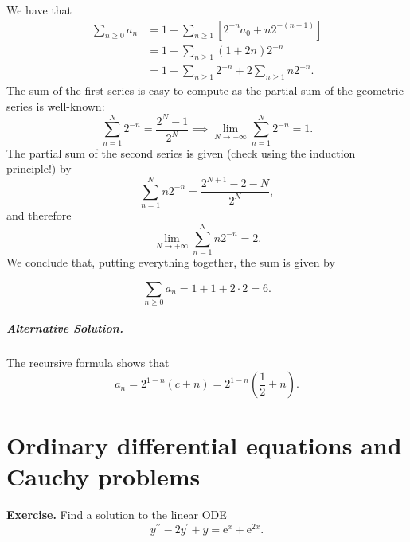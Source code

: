 \documentclass[a4paper,10 pt]{report}
\newcommand{\finalanswer}[1]{%
    \begin{finalAnswer}
    \[
        #1
    \]
    \end{finalAnswer}
}
\theoremstyle{definition}
\begin{document}
\begin{solutionBox} We have that
\begin{equation*} \begin{aligned} \sum_{n \geq 0} a_n & = 1 + \sum_{n \geq 1} \left[ 2^{-n} a_0 + n 2^{-(n - 1)} \right]
\\[1em] & = 1 + \sum_{n \geq 1} (1 + 2n) 2^{-n}
\\[1em] & = 1 + \sum_{n \geq 1} 2^{-n} + 2 \sum_{n \geq 1} n 2^{-n}.
\end{aligned}\end{equation*}
The sum of the first series is easy to compute as the partial sum of the geometric series is well-known:
\begin{equation*} \sum_{n = 1}^N 2^{-n} = \frac{2^N - 1}{2^N} \implies \lim_{N \to + \infty} \sum_{n = 1}^N 2^{-n}  = 1. \end{equation*}
The partial sum of the second series is given (check using the induction principle!) by
\begin{equation*} \sum_{n = 1}^N n 2^{-n} = \frac{2^{N + 1} - 2 - N}{2^N}, \end{equation*}
and therefore
\begin{equation*} \lim_{N \to + \infty} \sum_{n = 1}^N n 2^{-n} =2. \end{equation*}
We conclude that, putting everything together, the sum is given by
\finalanswer{
\sum_{n \geq 0} a_n = 1 + 1 + 2 \cdot 2 = 6.
}

\paragraph{Alternative Solution.} The recursive formula shows that
\begin{equation*} a_n = 2^{1 - n}(c + n) = 2^{1 - n} \left( \frac{1}{2} + n \right). \end{equation*}
\end{solutionBox}



\chapter{Ordinary differential equations and Cauchy problems}

\begin{exerciseBox} \textbf{Exercise.}  Find a solution to the linear ODE
\begin{equation} \label{9.1} y^{\prime \prime} - 2y^\prime + y = \mathrm{e}^x + \mathrm{e}^{2x}. \end{equation} \end{exerciseBox}
\end{document}
